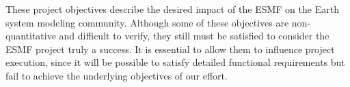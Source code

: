 These project objectives describe the desired impact of the ESMF on
the Earth system modeling community.  Although some of these
objectives are non-quantitative and difficult to verify, they still
must be satisfied to consider the ESMF project truly a success.  It is
essential to allow them to influence project execution, since it will
be possible to satisfy detailed functional requirements but fail to
achieve the underlying objectives of our effort.





